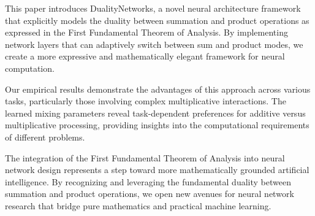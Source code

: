\documentclass{article}
\begin{document}
This paper introduces DualityNetworks, a novel neural architecture framework that explicitly models the duality between summation and product operations as expressed in the First Fundamental Theorem of Analysis. By implementing network layers that can adaptively switch between sum and product modes, we create a more expressive and mathematically elegant framework for neural computation.

Our empirical results demonstrate the advantages of this approach across various tasks, particularly those involving complex multiplicative interactions. The learned mixing parameters reveal task-dependent preferences for additive versus multiplicative processing, providing insights into the computational requirements of different problems.

The integration of the First Fundamental Theorem of Analysis into neural network design represents a step toward more mathematically grounded artificial intelligence. By recognizing and leveraging the fundamental duality between summation and product operations, we open new avenues for neural network research that bridge pure mathematics and practical machine learning.
\end{document}
